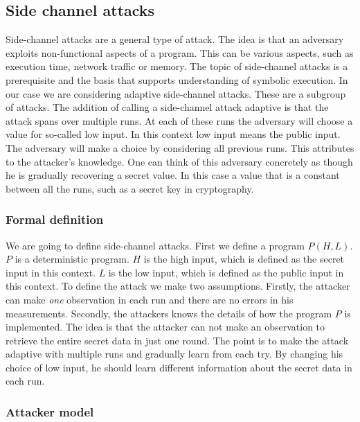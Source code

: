 \documentclass[11pt,a4paper,notitlepage]{article}
\begin{document}
\subsection{Side channel attacks}
\label{sec:sidechannelattacks}

Side-channel attacks are a general type of attack. The idea is that an adversary exploits non-functional aspects of a program. This can be various aspects, such as execution time, network traffic or memory. The topic of side-channel attacks is a prerequisite and the basis that supports understanding of symbolic execution. In our case we are considering adaptive side-channel attacks. These are a subgroup of attacks. The addition of calling a side-channel attack adaptive is that the attack spans over multiple runs. At each of these runs the adversary will choose a value for so-called low input. In this context low input means the public input. The adversary will make a choice by considering all previous runs. This attributes to the attacker's knowledge. One can think of this adversary concretely as though he is gradually recovering a secret value. In this case a value that is a constant between all the runs, such as a secret key in cryptography. 

\subsubsection{Formal definition}

We are going to define side-channel attacks. First we define a program $P(H,L)$. $P$ is a deterministic program. $H$ is the high input, which is defined as the secret input in this context. $L$ is the low input, which is defined as the public input in this context. To define the attack we make two assumptions. Firstly, the attacker can make \textit{one} observation in each run and there are no errors in his measurements. Secondly, the attackers knows the details of how the program $P$ is implemented. The idea is that the attacker can not make an observation to retrieve the entire secret data in just one round. The point is to make the attack adaptive with multiple runs and gradually learn from each try. By changing his choice of low input, he should learn different information about the secret data in each run. 

\subsubsection{Attacker model}
\end{document}
